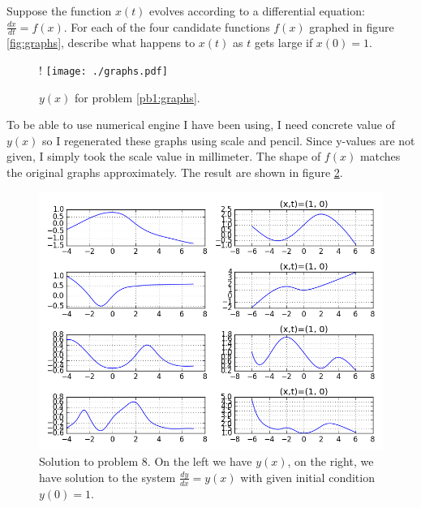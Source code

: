 \begin{questions}
    

\question[5]
\label{pb1:graphs}

Suppose the function $x(t)$ evolves according to a differential equation:
$\frac{dx}{dt} = f(x)$. For each of the four candidate functions $f(x)$
graphed in figure \ref{fig:graphs}, describe what happens to $x(t)$ as $t$
gets large if $x(0) = 1$.

\begin{figure}[htpb]!
    \centering
    \texttt{[image: ./graphs.pdf]}
    \caption{$y(x)$ for problem \ref{pb1:graphs}. }
    \label{fig:pb1_graph}
\end{figure}

\begin{solution}
    
    To be able to use numerical engine I have been using, I need concrete value
    of $y(x)$ so I regenerated these graphs using scale and pencil. Since
    y-values are not given, I simply took the scale value in millimeter.  The
    shape of $f(x)$ matches the original graphs approximately. The result are
    shown in figure \ref{fig:solve_pb1_graph}.
    
\end{solution}

\begin{figure}[htpb]
    \centering
    \includegraphics[width=\linewidth]{./solve_problem7_py.png}
    \caption{Solution to problem 8. On the left we have $y(x)$, on the right, we
    have solution to the system $\frac{dy}{dx} = y(x)$  with given initial
    condition $y(0) = 1 $.}
    \label{fig:solve_pb1_graph}
\end{figure}


\end{questions}
